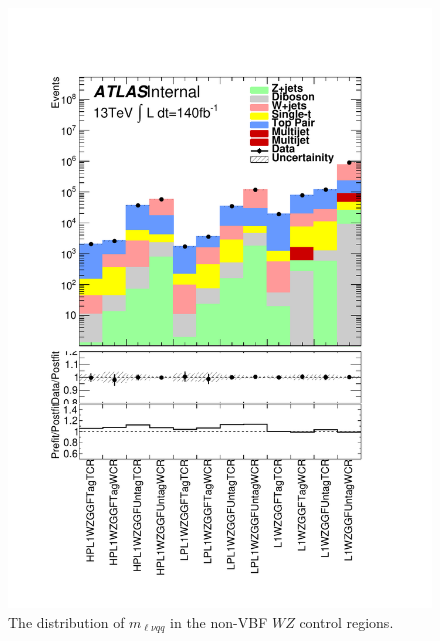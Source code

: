 \begin{figure}[h!]
  \centering
  \includegraphics[width=\hsize]{figures/results/HVTWZ/PlotyieldTable_postfit.pdf}
 \caption{The distribution of $m_{\ell\nu qq}$ in the non-VBF $WZ$ control regions.} 
  \label{fig:hvtwz_cr_postfit}
\end{figure} 
\FloatBarrier

